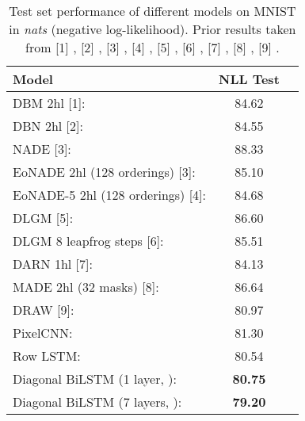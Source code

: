 \documentclass{article}
\begin{document}
\begin{table}[!h]
	\begin{center}
	\begin{tabular}{lcc}
		\toprule
		\textbf{Model} & \textbf{NLL Test}  \\ 
		\midrule
		DBM 2hl [1]: &  84.62 \\ 
		DBN 2hl [2]: &  84.55 \\ 
		NADE [3]: & 88.33 \\ 
		EoNADE 2hl (128 orderings) [3]: & 85.10 \\ 
		EoNADE-5 2hl (128 orderings) [4]: \quad \quad \quad & 84.68 \\ 
		DLGM [5]: &  86.60 \\ 
		DLGM 8 leapfrog steps [6]: &  85.51 \\ 
		DARN 1hl [7]: &  84.13 \\ 
		MADE 2hl (32 masks) [8]: & 86.64 \\
		DRAW [9]: &  80.97 \\ 
		\midrule
		PixelCNN: & 81.30 \\ 
		Row LSTM: & 80.54 \\ 
		Diagonal BiLSTM (1 layer, ): & \textbf{80.75} \\
		Diagonal BiLSTM (7 layers, ): & \textbf{79.20} \\ 
	    \bottomrule
	\end{tabular}
	\end{center}
\vspace{-0.2cm}
\caption{Test set performance of different models on MNIST in \emph{nats} (negative log-likelihood). Prior results taken from [1] \cite{salakhutdinov2009deep}, [2] \cite{murray2009evaluating}, [3] \cite{uria2013deep}, [4] \cite{raiko2014iterative}, [5] \cite{rezende2014stochastic}, [6] \cite{salimans2014markov}, [7] \cite{gregor2013deep}, [8] \cite{germain2015made}, [9] \cite{gregor2015draw}.}
\label{table:mnist}
\end{table}
\end{document}
